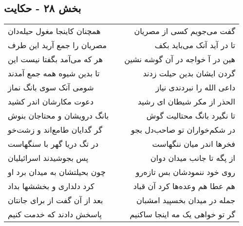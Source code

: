 \begin{center}
\section*{بخش ۲۸ - حکایت}
\label{sec:sh028}
\begin{longtable}{l p{0.5cm} r}
همچنان کاینجا مغول حیله‌دان
&&
گفت می‌جویم کسی از مصریان
\\
مصریان را جمع آرید این طرف
&&
تا در آید آنک می‌باید بکف
\\
هر که می‌آمد بگفتا نیست این
&&
هین در آ خواجه در آن گوشه نشین
\\
تا بدین شیوه همه جمع آمدند
&&
گردن ایشان بدین حیلت زدند
\\
شومی آنک سوی بانگ نماز
&&
داعی الله را نبردندی نیاز
\\
دعوت مکارشان اندر کشید
&&
الحذر از مکر شیطان ای رشید
\\
بانگ درویشان و محتاجان بنوش
&&
تا نگیرد بانگ محتالیت گوش
\\
گر گدایان طامع‌اند و زشت‌خو
&&
در شکم‌خواران تو صاحب‌دل بجو
\\
در تگ دریا گهر با سنگهاست
&&
فخرها اندر میان ننگهاست
\\
پس بجوشیدند اسرائیلیان
&&
از پگه تا جانب میدان دوان
\\
چون بحیلتشان به میدان برد او
&&
روی خود ننمودشان بس تازه‌رو
\\
کرد دلداری و بخششها بداد
&&
هم عطا هم وعده‌ها کرد آن قباد
\\
بعد از آن گفت از برای جانتان
&&
جمله در میدان بخسپید امشبان
\\
پاسخش دادند که خدمت کنیم
&&
گر تو خواهی یک مه اینجا ساکنیم
\\
\end{longtable}
\end{center}
